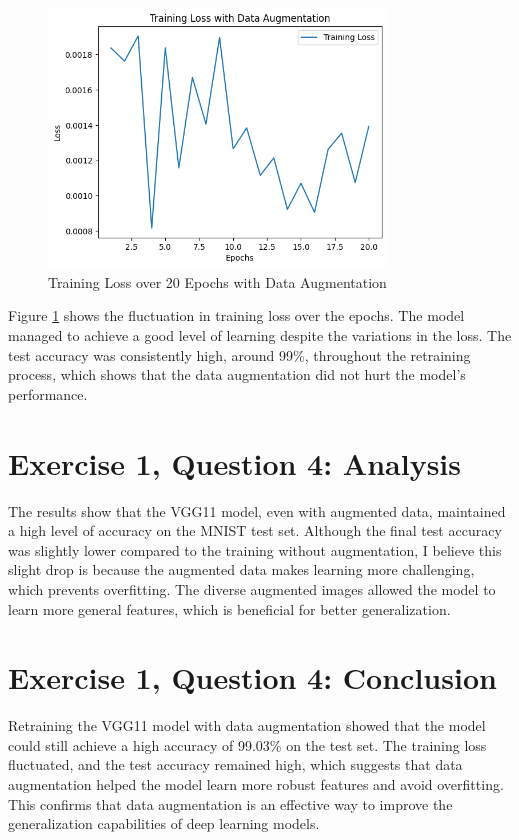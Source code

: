 \documentclass[10pt,letter,notitlepage]{article}
\begin{document}
\begin{center}
\begin{figure}[H]
    \centering
    \includegraphics[width=0.8\textwidth]{TrainingAug.png}
    \caption{Training Loss over 20 Epochs with Data Augmentation}
    \label{fig:train_loss_plot}
\end{figure}

Figure \ref{fig:train_loss_plot} shows the fluctuation in training loss over the epochs. The model managed to achieve a good level of learning despite the variations in the loss. The test accuracy was consistently high, around 99\%, throughout the retraining process, which shows that the data augmentation did not hurt the model's performance.

\section{Exercise 1, Question 4: Analysis}
The results show that the VGG11 model, even with augmented data, maintained a high level of accuracy on the MNIST test set. Although the final test accuracy was slightly lower compared to the training without augmentation, I believe this slight drop is because the augmented data makes learning more challenging, which prevents overfitting. The diverse augmented images allowed the model to learn more general features, which is beneficial for better generalization.

\section{Exercise 1, Question 4: Conclusion}
Retraining the VGG11 model with data augmentation showed that the model could still achieve a high accuracy of 99.03\% on the test set. The training loss fluctuated, and the test accuracy remained high, which suggests that data augmentation helped the model learn more robust features and avoid overfitting. This confirms that data augmentation is an effective way to improve the generalization capabilities of deep learning models.



\end{center}
\end{document}

